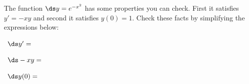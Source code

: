 The function {\large $\ds y=e^{-x^2}$} has some properties you can check.  First it satisfies $y'=-x y$ and second it satisfies $y(0)=1$.  Check these facts by simplifying the expressions below:

\bigskip

\, $\ds y' = $

\vspace{25mm}

\, $\ds - x y  = $

\vspace{25mm}

\, $\ds y(0) = $

